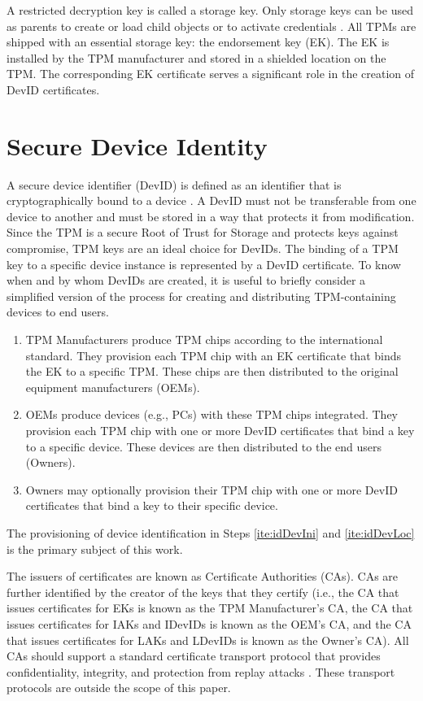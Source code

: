 \documentclass[runningheads]{llncs}
\begin{document}
A restricted decryption key is called a storage key. Only storage keys
can be used as parents to create or load child objects or to activate
credentials \citep{PracticalGuide}. All TPMs are shipped with an
essential storage key: the endorsement key (EK). The EK is installed
by the TPM manufacturer and stored in a shielded location on the
TPM. The corresponding EK certificate serves a significant role in the
creation of DevID certificates.

\section{Secure Device Identity}
A secure device identifier (DevID) is defined as an identifier that is cryptographically bound to a device \citep{DevIDSpec-IEEE}. A DevID must not be transferable from one device to another and must be stored in a way that protects it from modification. Since the TPM is a secure Root of Trust for Storage and protects keys against compromise, TPM keys are an ideal choice for DevIDs. 
The binding of a TPM key to a specific device instance is represented by a DevID certificate.
To know when and by whom DevIDs are created, it is useful to briefly consider a simplified version of the process for creating and distributing TPM-containing devices to end users.
\begin{enumerate}
  \item\label{ite:idTPM} TPM Manufacturers produce TPM chips according to the international standard. They provision each TPM chip with an EK certificate that binds the EK to a specific TPM. These chips are then distributed to the original equipment manufacturers (OEMs).
  \item\label{ite:idDevIni} OEMs produce devices (e.g., PCs) with these TPM chips integrated. They provision each TPM chip with one or more DevID certificates that bind a key to a specific device. These devices are then distributed to the end users (Owners).
  \item\label{ite:idDevLoc} Owners may optionally provision their TPM chip with one or more DevID certificates that bind a key to their specific device.
\end{enumerate} 

The provisioning of device identification in Steps \ref{ite:idDevIni}
and \ref{ite:idDevLoc} is the primary subject of this work.

The issuers of  certificates are known as Certificate Authorities (CAs). CAs are further identified by the creator of the keys that they certify (i.e., the CA that issues certificates for EKs is known as the TPM Manufacturer's CA, the CA that issues certificates for IAKs and IDevIDs is known as the OEM's CA, and the CA that issues certificates for LAKs and LDevIDs is known as the Owner's CA). All CAs should support a standard certificate transport protocol that provides confidentiality, integrity, and protection from replay attacks \citep{DevIDSpec-TCG}. These transport protocols are outside the scope of this paper. 
\end{document}
